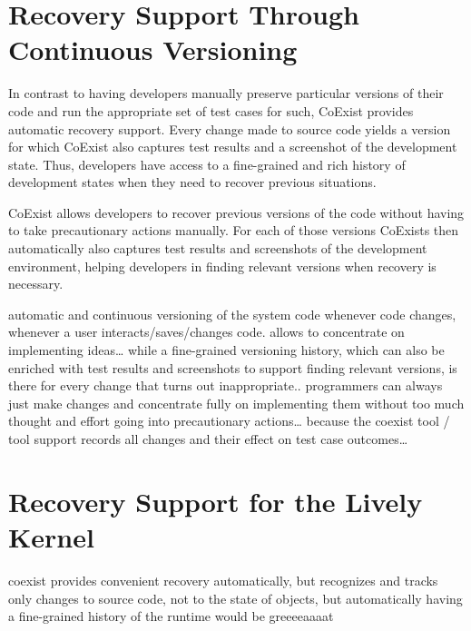 \section{Recovery Support Through Continuous Versioning}

In contrast to having developers manually preserve particular versions of their code and run the appropriate set of test cases for such, CoExist provides automatic recovery support.
Every change made to source code yields a version for which CoExist also captures test results and a screenshot of the development state.
Thus, developers have access to a fine-grained and rich history of development states when they need to recover previous situations.

CoExist allows developers to recover previous versions of the code without having to take precautionary actions manually.
For each of those versions CoExists then automatically also captures test results and screenshots of the development environment, helping developers in finding relevant versions when recovery is necessary.


automatic and continuous versioning of the system code whenever code changes, whenever a user interacts/saves/changes code.
allows to concentrate on implementing ideas… while a fine-grained versioning history, which can also be enriched with test results and screenshots to support finding relevant versions, is there for every change that turns out inappropriate.. programmers can always just make changes and concentrate fully on implementing them without too much thought and effort going into precautionary actions… because the coexist tool / tool support records all changes and their effect on test case outcomes… 



\section{Recovery Support for the Lively Kernel}

coexist provides convenient recovery automatically, but recognizes and tracks only changes to source code, not to the state of objects, but automatically having a fine-grained history of the runtime would be greeeeaaaat 

